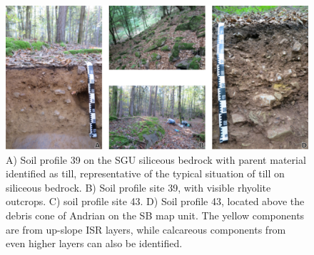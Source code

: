 \documentclass[preprint,12pt,authoryear]{elsarticle}
\begin{document}
 \begin{figure}[ht!]
\includegraphics[width=\textwidth,angle=0]{soils_110pi.pdf}
\caption{A) Soil profile 39 on the SGU siliceous bedrock with parent material identified as till, representative of the typical situation of till on siliceous bedrock. B) Soil profile site 39, with visible rhyolite outcrops.  C) soil profile site 43. D) Soil profile 43, located above the debris cone of Andrian on the SB map unit. The yellow components are from up-slope ISR layers, while calcareous components from even higher layers can also be identified.}
\label{fig:soils}
\end{figure}
\end{document}
